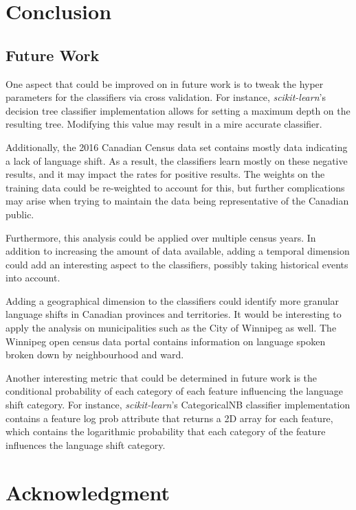 \documentclass[10pt, conference, compsocconf]{IEEEtran}
\begin{document}
\section{Conclusion}


\subsection{Future Work}
One aspect that could be improved on in future work is to tweak the hyper parameters for the classifiers via cross validation. For instance, \textit{scikit-learn}'s decision tree classifier implementation allows for setting a maximum depth on the resulting tree. Modifying this value may result in a mire accurate classifier.

Additionally, the 2016 Canadian Census data set contains mostly data indicating a lack of language shift. As a result, the classifiers learn mostly on these negative results, and it may impact the rates for positive results. The weights on the training data could be re-weighted to account for this, but further complications may arise when trying to maintain the data being representative of the Canadian public.

Furthermore, this analysis could be applied over multiple census years. In addition to increasing the amount of data available, adding a temporal dimension could add an interesting aspect to the classifiers, possibly taking historical events into account.

Adding a geographical dimension to the classifiers could identify more granular language shifts in Canadian provinces and territories. It would be interesting to apply the analysis on municipalities such as the City of Winnipeg as well. The Winnipeg open census data portal contains information on language spoken broken down by neighbourhood and ward.

Another interesting metric that could be determined in future work is the conditional probability of each category of each feature influencing the language shift category. For instance, \textit{scikit-learn}'s CategoricalNB classifier implementation contains a feature log prob attribute that returns a 2D array for each feature, which contains the logarithmic probability that each category of the feature influences the language shift category.

\section*{Acknowledgment}
\end{document}
